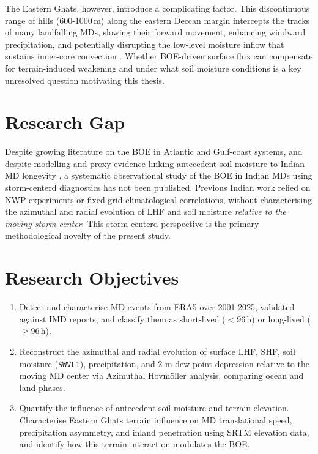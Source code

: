 The Eastern Ghats, however, introduce a complicating factor. This
discontinuous range of hills (600-1000\,m) along the eastern Deccan
margin intercepts the tracks of many landfalling MDs, slowing their
forward movement, enhancing windward precipitation, and potentially
disrupting the low-level moisture inflow that sustains inner-core
convection \autocite{houze1994}. Whether BOE-driven surface flux can
compensate for terrain-induced weakening and under what soil moisture
conditions is a key unresolved question motivating this thesis.

\section{Research Gap}
\label{sec:intro_gap}

Despite growing literature on the BOE in Atlantic and Gulf-coast
systems, and despite modelling and proxy evidence linking antecedent
soil moisture to Indian MD longevity \autocite{kishtawal2013enhancement,
osuri2020, hunt2017effect}, a systematic observational study of the
BOE in Indian MDs using storm-centerd diagnostics has not been
published. Previous Indian work relied on NWP experiments or
fixed-grid climatological correlations, without characterising the
azimuthal and radial evolution of LHF and soil moisture
\emph{relative to the moving storm center}. This storm-centerd
perspective is the primary methodological novelty of the present study.

\section{Research Objectives}
\label{sec:intro_objectives}

\begin{enumerate}
  \item Detect and characterise MD events from ERA5 over 2001-2025,
    validated against IMD reports, and classify them as short-lived
    ($<96$\,h) or long-lived ($\geq 96$\,h).
  \item Reconstruct the azimuthal and radial evolution of surface LHF,
    SHF, soil moisture (\texttt{SWVL1}), precipitation, and 2-m dew-point
    depression relative to the moving MD center via Azimuthal
    Hovm\"{o}ller analysis, comparing ocean and land phases.
  \item Quantify the influence of antecedent soil moisture and
    terrain elevation. Characterise Eastern Ghats terrain influence
    on MD translational speed, precipitation asymmetry, and inland
    penetration using SRTM elevation data, and identify how this
    terrain interaction modulates the BOE.
\end{enumerate}

